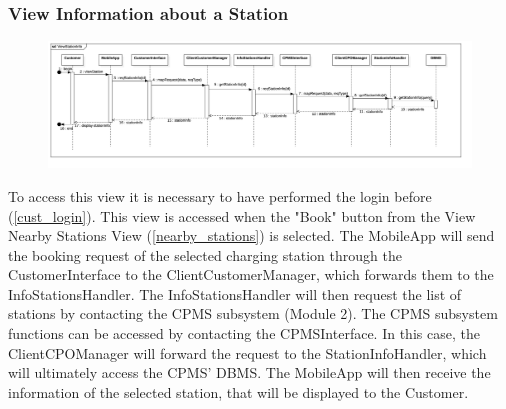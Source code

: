 \subsubsection{View Information about a Station}
\begin{figure}[H]
    \begin{center}
        \includegraphics[width=\textwidth]{img/runtime/station_info}
    \end{center}
\end{figure}
To access this view it is necessary to have performed the login before (\ref{cust_login}). This view is accessed when the "Book" button from the View Nearby Stations View (\ref{nearby_stations}) is selected. The MobileApp will send the booking request of the selected charging station through the CustomerInterface to the ClientCustomerManager, which forwards them to the InfoStationsHandler. The InfoStationsHandler will then request the list of stations by contacting the CPMS subsystem (Module 2). The CPMS subsystem functions can be accessed by contacting the CPMSInterface. In this case, the ClientCPOManager will forward the request to the StationInfoHandler, which will ultimately access the CPMS' DBMS. The MobileApp will then receive the information of the selected station, that will be displayed to the Customer.
